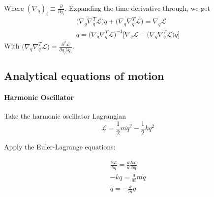 \documentclass[]{article}
\begin{document}
Where $(\nabla_{\dot{q}})_i \equiv \frac{\partial}{\partial \dot{q}_i}$. Expanding the time derivative through, we get
\begin{eqnarray}
	\big( \nabla_{\dot{q}} \nabla_{\dot{q}}^T \mathcal{L} \big) \ddot{q} + \big( \nabla_q \nabla_{\dot{q}}^T \mathcal{L}\big)= \nabla_q \mathcal{L} \\
	\ddot{q} = \big( \nabla_{\dot{q}} \nabla_{\dot{q}}^T \mathcal{L} \big)^{-1} \big[ \nabla_q \mathcal{L} - \big( \nabla_q \nabla_{\dot{q}}^T \mathcal{L}\big) \dot{q}\big]
\end{eqnarray}
With $\big( \nabla_q \nabla_{\dot{q}}^T \mathcal{L}\big) = \frac{\partial^2 \mathcal{L}}{\partial q_j \partial \dot{q}_i}$. 

\subsection{Analytical equations of motion}

\paragraph{Harmonic Oscillator}

Take the harmonic oscillator Lagrangian 
\begin{equation}
	\mathcal{L} = \frac{1}{2}m \dot{q}^2 - \frac{1}{2}k q^2
\end{equation}

Apply the Euler-Lagrange equations\cite{Taylor}:

\begin{eqnarray}
	\frac{\partial \mathcal{L}}{\partial q} = \frac{d}{d} \frac{\partial \mathcal{L}}{\partial \dot{q}} \\
	-kq = \frac{d}{dt} m\dot{q} \\
	\ddot{q} = -\frac{k}{m} q
\end{eqnarray}

\printbibliography
\end{document}
